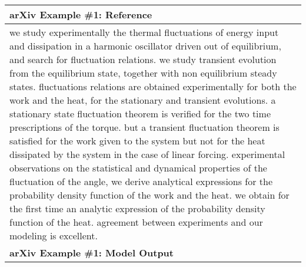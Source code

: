 \begin{table}[!htbp]
    \centering
    \tiny
    \begin{tabular}{p{\linewidth}} 
    \toprule
    \textbf{arXiv Example \#1: Reference} \\
    \midrule
we study experimentally the thermal fluctuations of energy input and dissipation in a harmonic oscillator driven out of equilibrium, and search for fluctuation relations. we study transient evolution from the equilibrium state, together with non equilibrium steady states. fluctuations relations are obtained experimentally for both the work and the heat, for the stationary and transient evolutions. a stationary state fluctuation theorem is verified for the two time prescriptions of the torque. but a transient fluctuation theorem is satisfied for the work given to the system but not for the heat dissipated by the system in the case of linear forcing. experimental observations on the statistical and dynamical properties of the fluctuation of the angle, we derive analytical expressions for the probability density function of the work and the heat. we obtain for the first time an analytic expression of the probability density function of the heat. agreement between experiments and our modeling is excellent.
    \\
    \midrule
    \textbf{arXiv Example \#1: Model Output} \\
    \midrule


\end{tabular}
\end{table}
